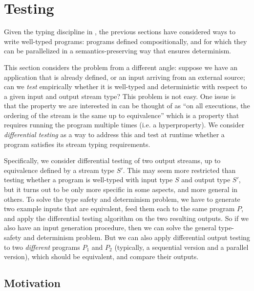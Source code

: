\chapter{Testing}
\label{cha:testing}

Given the typing discipline in , the previous sections have considered ways to write well-typed programs: programs defined compositionally, and for which they can be parallelized in a semantics-preserving way that ensures determinism.

This section considers the problem from a different angle: suppose we have an application that is already defined, or an input arriving from an external source; can we \emph{test} empirically whether it is well-typed and deterministic with respect to a given input and output stream type?
This problem is not easy. One issue is that the property we are interested in can be thought of as ``on all executions, the ordering of the stream is the same up to equivalence'' which is a property that requires running the program multiple times (i.e. a hyperproperty).
We consider \emph{differential testing} as a way to address this and test at runtime whether a program satisfies its stream typing requirements.

Specifically, we consider differential testing of two output streams, up to equivalence defined by a stream type $S'$.
This may seem more restricted than testing whether a program is well-typed with input type $S$ and output type $S'$,
but it turns out to be only more specific in some aspects, and more general in others.
To solve the type safety and determinism problem, we have to generate two example inputs that are equivalent, feed them each to the same program $P$, and apply the differential testing algorithm on the two resulting outputs.
So if we also have an input generation procedure, then we can solve the general type-safety and determinism problem.
But we can also apply differential output testing to two \emph{different} programs $P_1$ and $P_2$ (typically, a sequential version and a parallel version), which should be equivalent, and compare their outputs.

\section{Motivation}
\label{diffstream:sec:introduction}

